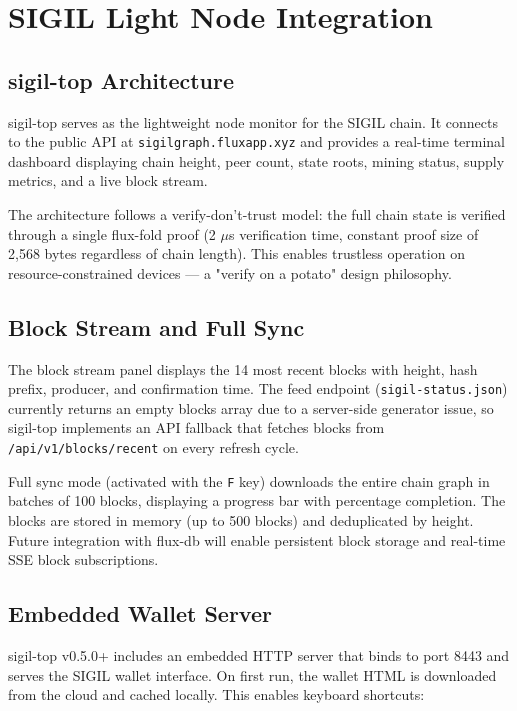\documentclass[11pt,a4paper]{article}
\begin{document}
\section{SIGIL Light Node Integration}

\subsection{sigil-top Architecture}

sigil-top serves as the lightweight node monitor for the SIGIL chain. It connects to the public API at \texttt{sigilgraph.fluxapp.xyz} and provides a real-time terminal dashboard displaying chain height, peer count, state roots, mining status, supply metrics, and a live block stream.

The architecture follows a verify-don't-trust model: the full chain state is verified through a single flux-fold proof (2 $\mu$s verification time, constant proof size of 2,568 bytes regardless of chain length). This enables trustless operation on resource-constrained devices — a "verify on a potato" design philosophy.

\subsection{Block Stream and Full Sync}

The block stream panel displays the 14 most recent blocks with height, hash prefix, producer, and confirmation time. The feed endpoint (\texttt{sigil-status.json}) currently returns an empty blocks array due to a server-side generator issue, so sigil-top implements an API fallback that fetches blocks from \texttt{/api/v1/blocks/recent} on every refresh cycle.

Full sync mode (activated with the \texttt{F} key) downloads the entire chain graph in batches of 100 blocks, displaying a progress bar with percentage completion. The blocks are stored in memory (up to 500 blocks) and deduplicated by height. Future integration with flux-db will enable persistent block storage and real-time SSE block subscriptions.

\subsection{Embedded Wallet Server}

sigil-top v0.5.0+ includes an embedded HTTP server that binds to port 8443 and serves the SIGIL wallet interface. On first run, the wallet HTML is downloaded from the cloud and cached locally. This enables keyboard shortcuts:
\end{document}
